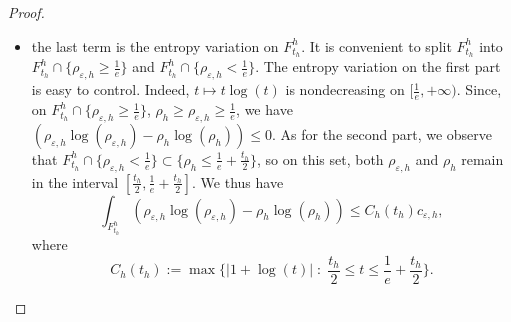 \documentclass[12pt, a4paper]{article}
\numberwithin{equation}{section}
\theoremstyle{plain}
\theoremstyle{definition}
\theoremstyle{remark}
\newcommand\eps{\varepsilon}
\begin{document}
\begin{proof}
\begin{itemize}
\item the last term is the entropy variation on $F_{t_h}^h$. It is convenient to split $F_{t_h}^h$ into  $F_{t_h}^h\cap \{\rho_{\eps, h} \ge \frac{1}{e}\}$ and $F_{t_h}^h\cap \{\rho_{\eps, h} < \frac{1}{e}\}$. The entropy variation on the first part is easy to control. Indeed, $t\mapsto t\log(t)$ is nondecreasing on $[\frac{1}{e}, +\infty)$. Since, on $F_{t_h}^h\cap \{\rho_{\eps, h} \ge \frac{1}{e}\}$,  $\rho_{h} \ge \rho_{\eps, h} \ge \frac{1}{e}$, we have $(\rho_{\eps, h} \log(\rho_{\eps,h})-\rho_h\log (\rho_h)) \le 0$. As for the second part,  we observe that $F_{t_h}^h \cap \{\rho_{\eps, h} <  \frac{1}{e}\} \subset \{ \rho_h \le \frac{1}{e}+\frac{t_h}{2}\}$,  so on this set, both $\rho_{\eps, h}$ and $\rho_h$ remain in the interval $[\frac{t_h}{2},  \frac{1}{e} +\frac{t_h}{2}]$. We thus have
\begin{equation}\label{estim4}
\int_{F_{t_h}^h}  (\rho_{\eps, h} \log(\rho_{\eps, h})     -\rho_h \log (\rho_h)) \le  C_h(t_h) c_{\eps,h},
\end{equation}
where 
\begin{equation}\label{defchmh}
C_h(t_h):=\max  \Big\{ \vert 1+ \log(t) \vert \;   : \; \frac{t_h}{2}   \leq t \leq   \frac{1}{e} +\frac{t_h}{2}  \Big\}.
\end{equation}


\end{itemize}


\end{proof}
\end{document}
